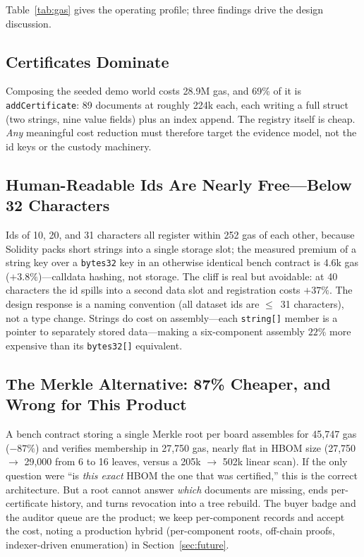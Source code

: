 \documentclass[conference]{IEEEtran}
\begin{document}
Table~\ref{tab:gas} gives the operating profile; three findings drive the design discussion.

\subsection{Certificates Dominate}
Composing the seeded demo world costs 28.9M gas, and 69\% of it is \texttt{addCertificate}: 89 documents at roughly 224k each, each writing a full struct (two strings, nine value fields) plus an index append. The registry itself is cheap. \emph{Any} meaningful cost reduction must therefore target the evidence model, not the id keys or the custody machinery.

\subsection{Human-Readable Ids Are Nearly Free---Below 32 Characters}
Ids of 10, 20, and 31 characters all register within 252 gas of each other, because Solidity packs short strings into a single storage slot; the measured premium of a string key over a \texttt{bytes32} key in an otherwise identical bench contract is 4.6k gas ($+3.8\%$)---calldata hashing, not storage. The cliff is real but avoidable: at 40 characters the id spills into a second data slot and registration costs $+37\%$. The design response is a naming convention (all dataset ids are $\le$~31 characters), not a type change. Strings do cost on assembly---each \texttt{string[]} member is a pointer to separately stored data---making a six-component assembly $22\%$ more expensive than its \texttt{bytes32[]} equivalent.

\subsection{The Merkle Alternative: 87\% Cheaper, and Wrong for This Product}
A bench contract storing a single Merkle root per board assembles for 45,747 gas ($-87\%$) and verifies membership in 27,750 gas, nearly flat in HBOM size (27,750 $\to$ 29,000 from 6 to 16 leaves, versus a 205k $\to$ 502k linear scan). If the only question were ``is \emph{this exact} HBOM the one that was certified,'' this is the correct architecture. But a root cannot answer \emph{which} documents are missing, ends per-certificate history, and turns revocation into a tree rebuild. The buyer badge and the auditor queue are the product; we keep per-component records and accept the cost, noting a production hybrid (per-component roots, off-chain proofs, indexer-driven enumeration) in Section~\ref{sec:future}.
\end{document}
